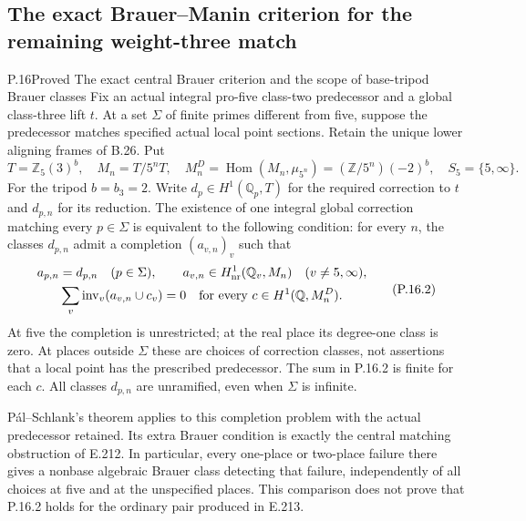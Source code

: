\subsection{The exact Brauer--Manin criterion for the remaining weight-three match}

\begin{result}{P.16}{Proved}
{The exact central Brauer criterion and the scope of base-tripod Brauer classes}
Fix an actual integral pro-five class-two predecessor and a global
class-three lift $t$. At a set $\Sigma$ of finite primes different
from five, suppose the predecessor matches specified actual local
point sections. Retain the unique lower aligning frames of B.26.
Put
\[
 T=\mathbb Z_5(3)^b,\quad M_n=T/5^nT,\quad
 M_n^D=\operatorname{Hom}(M_n,\mu_{5^n})
       =(\mathbb Z/5^n)(-2)^b,\quad S_5=\{5,\infty\}.
 \tag{P.16.1}
\]
For the tripod $b=b_3=2$. Write $d_p\in H^1(\mathbb Q_p,T)$
for the required correction to $t$ and $d_{p,n}$ for its reduction.
The existence of one integral global correction matching every
$p\in\Sigma$ is equivalent to the following condition:
for every $n$, the classes $d_{p,n}$ admit a completion
$(a_{v,n})_v$ such that
\[
 \begin{gathered}
 a_{p,n}=d_{p,n}\quad(p\in\Sigma),\qquad
 a_{v,n}\in H^1_{\rm nr}(\mathbb Q_v,M_n)
                         \quad(v\ne5,\infty),\\
 \sum_v\operatorname{inv}_v(a_{v,n}\cup c_v)=0
                \quad\hbox{for every }c\in H^1(\mathbb Q,M_n^D).
 \end{gathered}
 \tag{P.16.2}
\]
At five the completion is unrestricted; at the real place its
degree-one class is zero. At places outside $\Sigma$ these are
choices of correction classes, not assertions that a local point
has the prescribed predecessor. The sum in P.16.2 is finite for
each $c$. All classes $d_{p,n}$ are unramified, even when
$\Sigma$ is infinite.

P\'al--Schlank's theorem applies to this completion problem with
the actual predecessor retained. Its extra Brauer condition is
exactly the central matching obstruction of E.212. In particular,
every one-place or two-place failure there gives a nonbase
algebraic Brauer class detecting that failure, independently of
all choices at five and at the unspecified places. This comparison
does not prove that P.16.2 holds for the ordinary pair produced
in E.213.

\end{result}


